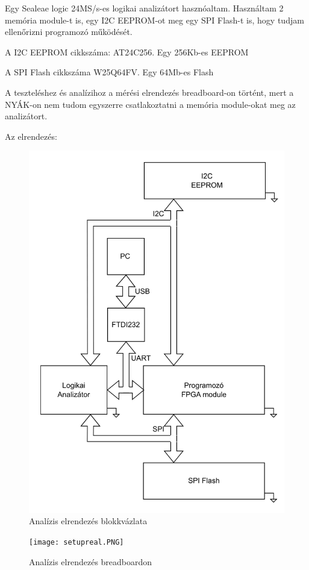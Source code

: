 \documentclass[a4paper,12pt,oneside]{book}
\begin{document}
Egy Sealeae logic 24MS/s-es logikai analizátort hasznóaltam. Használtam 2 memória module-t is, egy I2C EEPROM-ot meg egy SPI Flash-t is, hogy tudjam ellenőrizni programozó működését.

A I2C EEPROM cikkszáma: AT24C256. Egy 256Kb-es EEPROM \cite{EEPROM}

A SPI Flash cikkszáma W25Q64FV. Egy 64Mb-es Flash \cite{FLASH}

A teszteléshez és analízihoz a mérési elrendezés breadboard-on történt, mert a NYÁK-on nem tudom egyszerre csatlakoztatni a memória module-okat meg az analizátort.

Az elrendezés:
\begin{figure}[H]
	\centering
	\includegraphics[trim=1mm 1mm 1mm 1mm,scale=0.16]{setupblock.PNG}
	\caption{Analízis elrendezés blokkvázlata}
	\label{Analízis elrendezés blokkvázlata}
\end{figure}
\begin{figure}[H]  
	\centering
	\texttt{[image: setupreal.PNG]}
	\caption{Analízis elrendezés breadboardon}
	\label{Analízis elrendezés breadboardon}
\end{figure}
\end{document}
